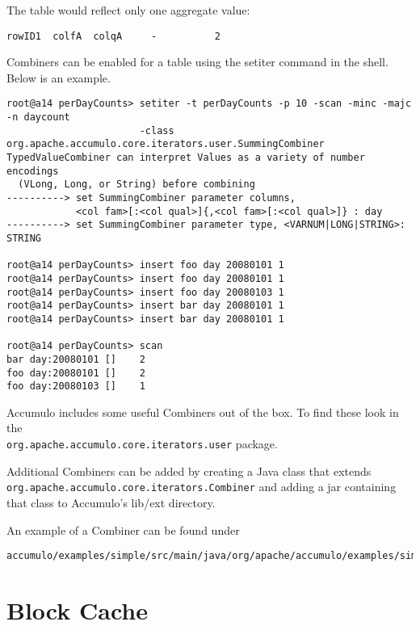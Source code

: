 The table would reflect only one aggregate value:

\begingroup\fontsize{8pt}{8pt}\selectfont\begin{verbatim}
rowID1  colfA  colqA     -          2
\end{verbatim}\endgroup

Combiners can be enabled for a table using the setiter command in the shell. Below is an example.

\begingroup\fontsize{8pt}{8pt}\selectfont\begin{verbatim}
root@a14 perDayCounts> setiter -t perDayCounts -p 10 -scan -minc -majc -n daycount 
                       -class org.apache.accumulo.core.iterators.user.SummingCombiner
TypedValueCombiner can interpret Values as a variety of number encodings 
  (VLong, Long, or String) before combining
----------> set SummingCombiner parameter columns, 
            <col fam>[:<col qual>]{,<col fam>[:<col qual>]} : day
----------> set SummingCombiner parameter type, <VARNUM|LONG|STRING>: STRING

root@a14 perDayCounts> insert foo day 20080101 1
root@a14 perDayCounts> insert foo day 20080101 1
root@a14 perDayCounts> insert foo day 20080103 1
root@a14 perDayCounts> insert bar day 20080101 1
root@a14 perDayCounts> insert bar day 20080101 1

root@a14 perDayCounts> scan
bar day:20080101 []    2
foo day:20080101 []    2
foo day:20080103 []    1
\end{verbatim}\endgroup

Accumulo includes some useful Combiners out of the box. To find these look in
the\\ \texttt{org.apache.accumulo.core.iterators.user} package.

Additional Combiners can be added by creating a Java class that extends\\
\texttt{org.apache.accumulo.core.iterators.Combiner} and adding a jar containing that
class to Accumulo's lib/ext directory.

An example of a Combiner can be found under

\begingroup\fontsize{8pt}{8pt}\selectfont\begin{verbatim}
accumulo/examples/simple/src/main/java/org/apache/accumulo/examples/simple/combiner/StatsCombiner.java
\end{verbatim}\endgroup


\section{Block Cache}

